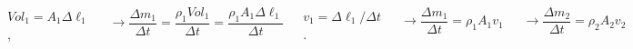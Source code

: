 \documentclass[]{beamer}
\begin{document}
\begin{frame}




 \begin{columns}[c]
   \column{2in}  %
  
 \begin{center}
  \includegraphics[height=2.5in]{images2/Fluids2.jpg}
\end{center}


   \column{2in}

\pause
\vspace{3mm}

$Vol_1= A_1 \Delta \ell_1$,
\vspace{3mm}

\pause

\begin{equation*}
   \rightarrow \frac{\Delta m_1}{\Delta t}=\frac{\rho_1 Vol_1}{\Delta t}=\frac{\rho_1A_1\Delta \ell_1}{\Delta t}
\end{equation*}
\vspace{3mm}

\pause

 $v_1=\Delta \ell_1/\Delta t$.
\vspace{3mm}

\pause
\begin{equation*}
  \rightarrow \frac{\Delta m_1}{\Delta t }=\rho_1 A_1 v_1
\end{equation*}

\vspace{3mm}

\pause



\begin{equation*}
  \rightarrow \frac{\Delta m_2}{\Delta t }=\rho_2 A_2 v_2
\end{equation*}


   \end{columns}

  \end{frame}
\end{document}
